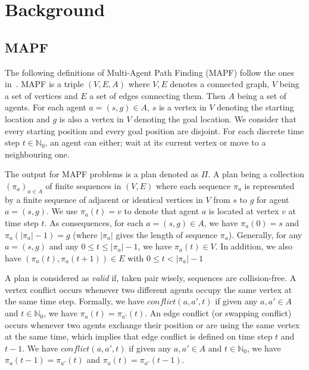\section{Background}\label{sec:background}

\subsection{MAPF}\label{sec:background_mapf}

The following definitions of Multi-Agent Path Finding (MAPF) follow the ones in~\cite{husvobbass22a}. MAPF is a triple $(V,E,A)$ where \(V,E\) denotes a connected graph, \(V\) being a set of vertices and \(E\) a set of edges connecting them. Then \(A\) being a set of agents. For each agent \(a=(s,g) \in A\), \(s\) is a vertex in \(V\) denoting the starting location and \(g\) is also a vertex in \(V\) denoting the goal location. We consider that every starting position and every goal position are disjoint.
For each discrete time step \(t\in \mathbb{N}_0\), an agent can either; wait at its current vertex or move to a neighbouring one.

The output for MAPF problems is a plan denoted as \(\Pi\). A plan being a collection $(\pi_a)_{a\in A}$ of finite sequences in $(V,E)$ where each sequence $\pi_a$ is represented by a finite sequence of adjacent or identical vertices in $V$ from $s$ to $g$ for agent $a = (s,g)$. We use \(\pi_a (t) = v\) to denote that agent \(a\) is located at vertex \(v\) at time step \(t\). 
As consequences, for each \(a=(s,g) \in A\), we have $\pi_a(0) = s$ and  $\pi_a(|\pi_a|-1) = g$ (where $|\pi_a|$ gives the length of sequence $\pi_a$). Generally, for any \(a=(s,g)\) and any $0 \leq t \leq |\pi_a|-1$, we have \(\pi_a(t) \in V\). In addition, we also have $(\pi_a(t),\pi_a(t+1))\in E$ with $0 \leq t < |\pi_a|-1$

A plan is considered as \textit{valid} if, taken pair wisely, sequences are collision-free. A vertex conflict occurs whenever two different agents occupy the same vertex at the same time step. Formally, we have \(conflict(a,a',t)\) if given any $a,a'\in A$  and $t\in\mathbb{N}_0$, we have $\pi_a(t) = \pi_{a'}(t)$. An edge conflict (or swapping conflict) occurs whenever two agents exchange their position or are using the same vertex at the same time, which implies that edge conflict is defined on time step \(t\) and \(t-1\). We have \(conflict(a,a',t)\) if given any $a,a'\in A$  and $t\in\mathbb{N}_0$, we have $\pi_a(t-1) = \pi_{a'}(t)$ and $\pi_a(t) = \pi_{a'}(t-1)$.

